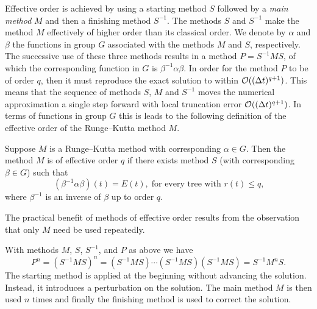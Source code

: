 Effective order is achieved by using a starting method $S$ followed by
a \emph{main method} $M$ %
and then a finishing method $S^{-1}$.
The methods $S$ and $S^{-1}$ make the method $M$ effectively of higher order than its classical order.
We denote by $\alpha$ and $\beta$ the functions in group $G$ associated with the methods $M$ and $S$, respectively.
The successive use of these three methods results in a method $P = S^{-1}MS$, of which the corresponding function in $G$ is $\beta^{-1}\alpha\beta$.
In order for the method $P$ to be of order $q$, then it must reproduce the exact solution to within $\mathcal{O}((\Delta t)^{q+1})$.
This means that the sequence of methods \( S \), \( M \) and \( S^{-1} \) moves the numerical approximation a single step forward with local truncation error \( \mathcal{O}((\Delta t)^{q+1}) \).
In terms of functions in group $G$ this is leads to the following definition of the effective order of the Runge--Kutta method $M$.
\begin{definition}\cite{Butcher1987_book}\label{def:Effective_order}
  Suppose $M$ is a Runge--Kutta method with corresponding $\alpha \in G$.
  Then the method $M$ is of effective order $q$ if there exists method
  $S$ (with corresponding $\beta \in G$) such that
	\begin{equation}\label{eq:Effective_order_1}
		(\beta^{-1}\alpha\beta)(t) = E(t), \; \text{for every tree with $r(t) \leq q$,}
	\end{equation}
        where $\beta^{-1}$ is an inverse of $\beta$ up to order $q$.
\end{definition}
The practical benefit of methods of effective order results from the
observation that only $M$ need be used repeatedly.
\begin{result}
  With methods $M$, $S$, $S^{-1}$, and $P$ as above we have
  $$P^n = (S^{-1}MS)^n = (S^{-1}MS) \cdots (S^{-1}MS) (S^{-1}MS)
        = S^{-1} M^n S.$$
The starting method is applied at the beginning without advancing the
solution.
Instead, it introduces a perturbation on the solution.
The main method \( M \) is then used \( n \) times and finally the
finishing method is used to correct the solution.
\end{result}



